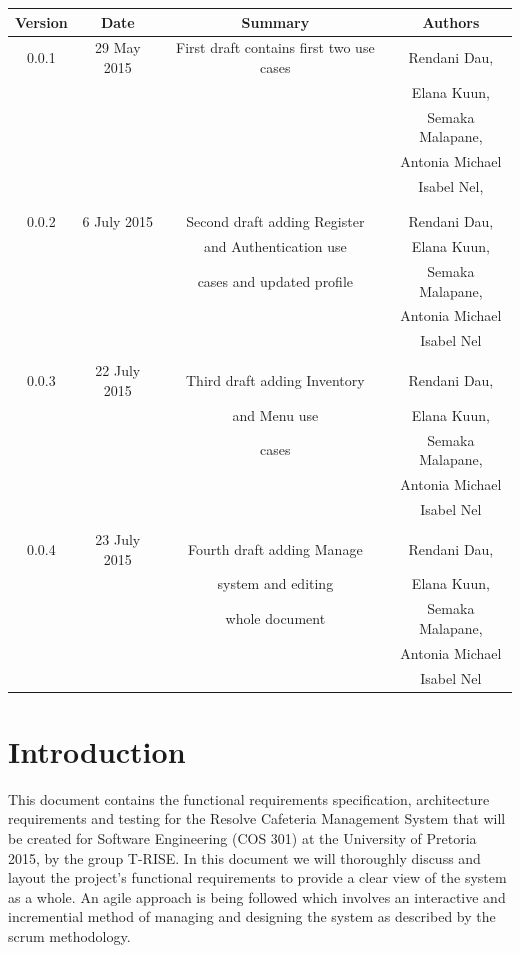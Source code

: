 \documentclass[a4paper,12pt]{article}
\begin{document}
\begin{table}[h!]
\centering
 \begin{tabular}{||c c c c||} 
 \hline
 \textbf{Version} & \textbf{Date} & \textbf{Summary} & \textbf{Authors} \\ [0.5ex] 
 \hline\hline
 0.0.1 & 29 May 2015 &  First draft contains first two use cases  & Rendani Dau, \\ & & & Elana Kuun, \\ & & & Semaka Malapane, \\ & & & Antonia Michael \\ & & & Isabel Nel, \\ & & & \\
 \hline 
 & & & \\
 0.0.2 & 6 July 2015 &  Second draft adding Register & Rendani Dau, \\ & & and Authentication use & Elana Kuun, \\ & & cases and updated profile & Semaka Malapane, \\ & & &  Antonia Michael \\ & & & Isabel Nel \\   [1ex] 
 \hline
& & & \\
 0.0.3 & 22 July 2015 &  Third draft adding Inventory & Rendani Dau, \\ & & and Menu use & Elana Kuun, \\ & & cases  & Semaka Malapane, \\ & & &  Antonia Michael \\ & & & Isabel Nel \\   [1ex] 
 \hline
& & & \\
 0.0.4 & 23 July 2015 &  Fourth draft adding Manage & Rendani Dau, \\ & & system and editing & Elana Kuun, \\ & & whole document  & Semaka Malapane, \\ & & &  Antonia Michael \\ & & & Isabel Nel \\   [1ex] 
\hline
 \end{tabular}
\end{table}

\pagebreak




\section{Introduction}
This document contains the functional requirements specification, architecture requirements and testing for the Resolve Cafeteria Management System that will be created for Software Engineering (COS 301) at the University of Pretoria 2015, by the group T-RISE. In this document we will thoroughly discuss and layout the project's functional requirements to provide a clear view of the system as a whole. An agile approach is being followed which involves an interactive and incremential method of managing and designing the system as described by the scrum methodology.
\end{document}
